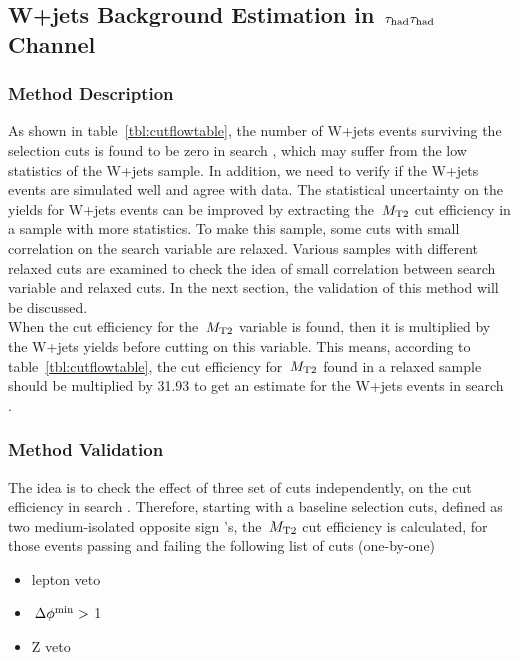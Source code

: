 \subsection{\texorpdfstring{W+jets Background Estimation in $\,\tau_{\rm had}\tau_{\rm had}$ Channel}{W+jets Background Estimation in tau-tau Channel}}
\subsubsection{Method Description}

As shown in table~\ref{tbl:cutflowtable}, the number of W+jets events surviving 
the selection cuts is found to be zero in search \binone, which may suffer from the low statistics of the W+jets sample. In addition, we need to verify if the W+jets events are simulated well and agree with data.
 The statistical uncertainty on the yields for W+jets events can be improved by extracting 
the $\,{M_{\rm T2}}$ cut efficiency in a sample with more statistics. To make this sample, some cuts with small correlation on the search variable are 
relaxed. Various samples with different relaxed cuts are examined to check the idea of small correlation 
between search variable and relaxed cuts. In the next section, the validation of this method will be discussed.\\
When the cut efficiency for the $\,{M_{\rm T2}}$ variable is found, then it is multiplied by the W+jets 
yields before cutting on this variable. This means, according to table~\ref{tbl:cutflowtable}, the cut efficiency for 
$\,{M_{\rm T2}}$ found in a relaxed sample should be multiplied by 31.93 to get an 
estimate for the W+jets events in search \binone.\\

\subsubsection{Method Validation}
The idea is to check the effect of three set of cuts independently, 
on the \mttwo cut efficiency in search \binone. 
Therefore, starting with a baseline selection cuts, defined as two 
medium-isolated opposite sign \Tau's, the $\,{M_{\rm T2}}$ cut 
efficiency is calculated, for those events passing and failing the following list of cuts (one-by-one)
\begin{itemize}
\item lepton veto
\item $\,{\Delta\phi^{\rm min}}>$ 1
\item Z veto 
\end{itemize}

